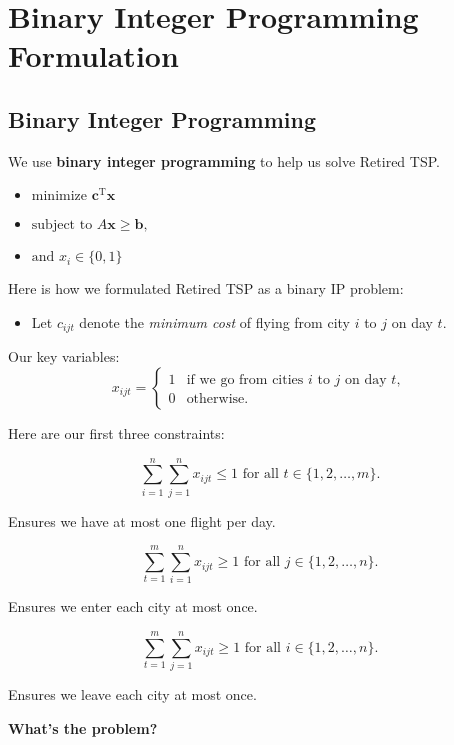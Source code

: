 \documentclass[10pt, xcolor=svgnames]{beamer}
\begin{document}
\section{Binary Integer Programming Formulation}

\subsection{Binary Integer Programming}

\begin{frame}
We use \textbf{binary integer programming} to help us solve Retired TSP.

\begin{itemize}
    \item $\text{minimize }   \mathbf{c}^\mathrm{T} \mathbf{x} $
    \item $\text{subject to } A \mathbf{x} \ge \mathbf{b},$
    \item $\text{and } x_i \in \{0,1\}$
\end{itemize}

\pause
Here is how we formulated Retired TSP as a binary IP problem:

\begin{itemize}
    \item Let $c_{ijt}$ denote the \emph{minimum cost} of flying from city $i$ to $j$ on day $t$.
\end{itemize}
Our key variables:
\[
x_{ijt} = \begin{cases}
1 &\mbox{if we go from cities } i \mbox{ to } j \mbox{ on day } t, \\ 
0 & \mbox{otherwise}.
\end{cases}
\]
\end{frame}

\begin{frame}
Here are our first three constraints:

\begin{equation}
\sum_{i=1}^{n} \sum_{j=1}^{n} x_{ijt} \le 1 \mbox{ for all } t \in \{1, 2, \ldots, m\}.
\end{equation}

Ensures we have at most one flight per day.

\pause
\begin{equation}
\sum_{t=1}^{m} \sum_{i=1}^{n} x_{ijt} \ge 1 \mbox{ for all } j \in \{1, 2, \ldots, n\}.
\end{equation}

Ensures we enter each city at most once.

\pause
\begin{equation}
\sum_{t=1}^{m} \sum_{j=1}^{n} x_{ijt} \ge 1 \mbox{ for all } i \in \{1, 2, \ldots, n\}.
\end{equation}

Ensures we leave each city at most once.\\
\pause

\textbf{What's the problem?}
\end{frame}
\end{document}

